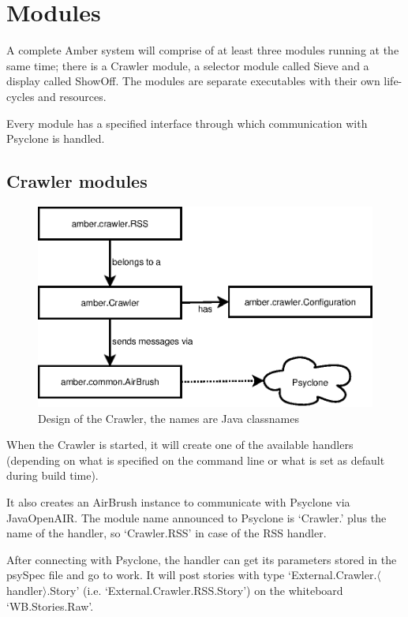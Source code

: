 \section{\label{sct:modules}Modules}

A complete Amber system will comprise of at least three modules running at the
same time; there is a Crawler module, a selector module called Sieve and a
display called ShowOff. The modules are separate executables with their own
life-cycles and resources.

Every module has a specified interface through which communication with
Psyclone is handled.

\subsection{Crawler modules}

\begin{figure}
    \includegraphics{image/crawler}
    \caption{Design of the Crawler, the names are Java classnames}
\end{figure}

When the Crawler is started, it will create one of the available handlers
(depending on what is specified on the command line or what is set as default
during build time). 

It also creates an AirBrush instance to communicate with Psyclone via
Java\-Open\-AIR. The module name announced to Psyclone is `Crawler.' plus the
name of the handler, so `Crawler.RSS' in case of the RSS handler.

After connecting with Psyclone, the handler can get its parameters stored in
the psySpec file and go to work. It will post stories with type
`External.Crawler.$\langle$handler$\rangle$.Story' (i.e.
`External.Crawler.RSS.Story') on the whiteboard `WB.Stories.Raw'.

